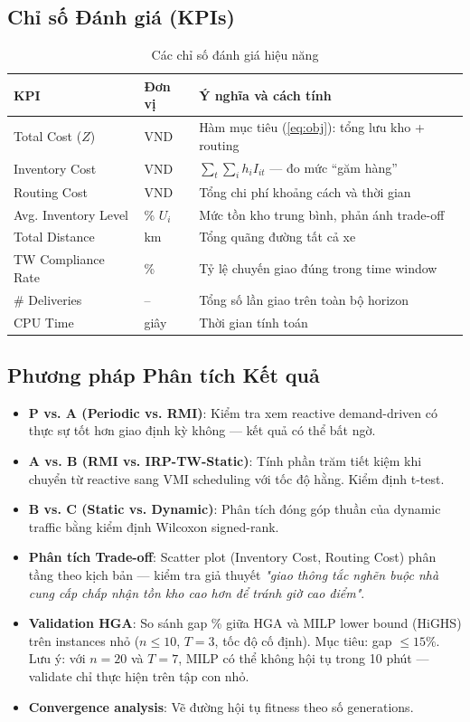 \documentclass[12pt,a4paper]{article}
\newcommand{\boldterm}[1]{\textbf{\color{primary}#1}}
\begin{document}
\subsection{Chỉ số Đánh giá (KPIs)}

\begin{table}[htbp]
\centering
\caption{Các chỉ số đánh giá hiệu năng}
\label{tab:kpis}
\renewcommand{\arraystretch}{1.25}
\begin{tabularx}{\linewidth}{@{}l l X@{}}
\toprule
\textbf{KPI} & \textbf{Đơn vị} & \textbf{Ý nghĩa và cách tính} \\
\midrule
Total Cost ($Z$) & VND & Hàm mục tiêu (\ref{eq:obj}): tổng lưu kho + routing \\
Inventory Cost   & VND & $\sum_t \sum_i h_i I_{it}$ --- đo mức ``găm hàng'' \\
Routing Cost     & VND & Tổng chi phí khoảng cách và thời gian \\
Avg. Inventory Level & \% $U_i$ & Mức tồn kho trung bình, phản ánh trade-off \\
Total Distance   & km & Tổng quãng đường tất cả xe \\
TW Compliance Rate & \% & Tỷ lệ chuyến giao đúng trong time window \\
\# Deliveries    & --  & Tổng số lần giao trên toàn bộ horizon \\
CPU Time         & giây & Thời gian tính toán \\
\bottomrule
\end{tabularx}
\end{table}

\subsection{Phương pháp Phân tích Kết quả}

\begin{itemize}[leftmargin=*]
  \item \boldterm{P vs. A (Periodic vs. RMI)}: Kiểm tra xem reactive demand-driven
        có thực sự tốt hơn giao định kỳ không --- kết quả có thể bất ngờ.
  \item \boldterm{A vs. B (RMI vs. IRP-TW-Static)}: Tính phần trăm tiết kiệm khi
        chuyển từ reactive sang VMI scheduling với tốc độ hằng. Kiểm định t-test.
  \item \boldterm{B vs. C (Static vs. Dynamic)}: Phân tích đóng góp thuần của
        dynamic traffic bằng kiểm định Wilcoxon signed-rank.
  \item \boldterm{Phân tích Trade-off}: Scatter plot (Inventory Cost, Routing Cost)
        phân tầng theo kịch bản --- kiểm tra giả thuyết \textit{"giao thông tắc nghẽn
        buộc nhà cung cấp chấp nhận tồn kho cao hơn để tránh giờ cao điểm"}.
  \item \boldterm{Validation HGA}: So sánh gap \% giữa HGA và MILP lower bound (HiGHS)
        trên instances nhỏ ($n \leq 10$, $T = 3$, tốc độ cố định). Mục tiêu: gap $\leq 15\%$.
        Lưu ý: với $n=20$ và $T=7$, MILP có thể không hội tụ trong 10 phút ---
        validate chỉ thực hiện trên tập con nhỏ.
  \item \boldterm{Convergence analysis}: Vẽ đường hội tụ fitness theo số generations.
\end{itemize}
\end{document}
